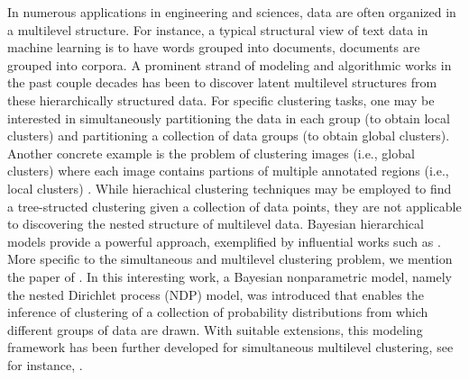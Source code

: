 In numerous applications in engineering and sciences, data are often organized in
a multilevel structure. For instance, a typical structural view of text data in machine learning
is to have words grouped into documents, documents are grouped into 
corpora. A prominent strand of modeling and algorithmic works in the past couple decades
has been to discover latent multilevel structures from these hierarchically structured data. 
For specific clustering tasks, one may be interested in simultaneously partitioning the data in each 
group (to obtain local clusters) and partitioning a collection of data groups (to obtain global clusters). 
Another concrete example is the problem of clustering images (i.e., global clusters) where each image 
contains partions of multiple annotated regions (i.e., local clusters) \citep{Oliva-2001}. 
While hierachical clustering techniques may be employed to find a tree-structed clustering 
given a collection of data points, they are not applicable to discovering the nested structure of multilevel data.
Bayesian hierarchical models provide a powerful approach, exemplified by influential works such as
\cite{Blei-etal-03,Pritchard-etal-00,Teh-etal-06}. More specific to the simultaneous and multilevel
clustering problem, we mention the paper of \cite{Rodriguez-etal-08}. In this interesting work,
a Bayesian nonparametric model, namely the nested Dirichlet process (NDP) model,
was introduced that enables
the inference of clustering of a collection of probability distributions from which different 
groups of data are drawn. With suitable extensions, this modeling framework
has been further developed for simultaneous multilevel clustering, see for instance, 
\citep{Wulsin-2016,Vu-2014,Viet-2016}. 

